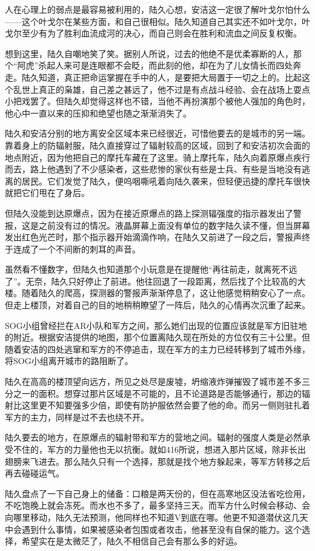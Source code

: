 人在心理上的弱点是最容易被利用的，陆久心想，安洁这一定很了解叶戈尔怕什么——这个叶戈尔在某些方面，和自己很相似。陆久知道自己其实还不如叶戈尔，叶戈尔至少有为了胜利血流成河的决心，而自己则会在胜利和流血之间反复权衡。

想到这里，陆久自嘲地笑了笑。据别人所说，过去的他绝不是优柔寡断的人，那个“阿虎”杀起人来可是连眼都不会眨，而此刻的他，却在为了儿女情长而四处奔走。陆久知道，真正把命运掌握在手中的人，是要把大局置于一切之上的。比起这个乱世上真正的枭雄，自己差之甚远了，他不过是有点战斗经验、会在战场上耍点小把戏罢了。但陆久却觉得这样也不错，当他不再扮演那个被他人强加的角色时，他心中一直以来的压抑和绝望也随之渐渐消失了。

陆久和安洁分别的地方离安全区域本来已经很近，可惜他要去的是城市的另一端。靠着身上的防辐射服，陆久直接穿过了辐射较高的区域，回到了和安洁初次会面的地点附近，因为他把自己的摩托车藏在了这里。骑上摩托车，陆久向着原爆点疾行而去，路上他遇到了不少感染者，这些悲惨的家伙有些是士兵、有些是当地没有逃离的居民。它们发觉了陆久，便呜咽嘶吼着向陆久袭来，但轻便迅捷的摩托车很快就把它们甩在了身后。

但陆久没能到达原爆点，因为在接近原爆点的路上探测辐强度的指示器发出了警报，这是之前没有过的情况。液晶屏幕上面没有单位的数字陆久读不懂，但当屏幕发出红色光芒时，那个指示器开始滴滴作响，在陆久又前进了一段之后，警报声终于连成了一个不间断的刺耳的声音。

虽然看不懂数字，但陆久也知道那个小玩意是在提醒他“再往前走，就离死不远了”。无奈，陆久只好停止了前进。他往回退了一段距离，然后找了个比较高的大楼。随着陆久的爬高，探测器的警报声渐渐停息了，这让他感觉稍稍安心了一点。但走上楼顶，对着自己的目的地稍稍瞭望了一阵后，陆久的心情再次沉重了起来。

SOG小组曾经拦在AR小队和军方之间，那么她们出现的位置应该就是军方旧驻地的附近。根据安洁提供的地图，那个位置离陆久现在所处的方位仅有三十公里。但随着安洁的四处逃窜和军方的不停追击，现在军方的主力已经转移到了城市外缘，将SOG小组离开城市的路阻断了。

陆久在高高的楼顶望向远方，所见之处尽是废墟，坍缩液炸弹摧毁了城市差不多三分之一的面积。想穿过那片区域是不可能的，且不论道路是否能够通行，那边的辐射比这里更不知要强多少倍，即使有防护服依然会要了他的命。而另一侧则驻扎着军方的主力，同样是过不去也绕不开。

陆久要去的地方，在原爆点的辐射带和军方的营地之间。辐射的强度人类是必然承受不住的，军方的力量他也无以抗衡。就如416所说，想进入那片区域，除非长出翅膀来飞进去。那么陆久只有一个选择，那就是找个地方躲起来，等军方转移之后再去碰碰运气。

陆久盘点了一下自己身上的储备：口粮是两天份的，但在高寒地区没法省吃俭用，不吃饱晚上就会冻死。而水也不多了，最多坚持三天。而军方什么时候会移动、会向哪里移动，陆久无法预测，他同样也不知道V到底在哪。他更不知道潜伏这几天中会遇到什么事情，如果被感染者包围或者攻击，他甚至没有自保的能力。这个选择，希望实在是太微茫了，陆久不相信自己会有那么多的好运。

